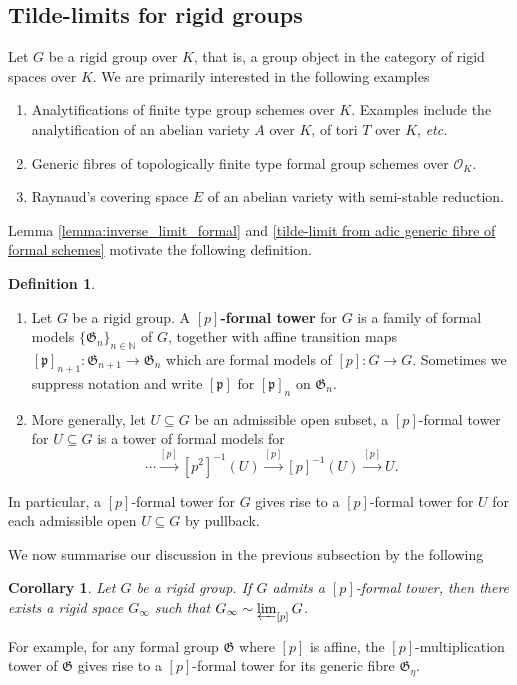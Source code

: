 \documentclass[10pt,oneside]{amsart}
\newtheorem{corollary}[theorem]{Corollary}
\theoremstyle{definition}
\newtheorem{definition}[theorem]{Definition}
\begin{document}
	
\subsection{Tilde-limits for rigid groups}

Let $G$ be a rigid group over $K$, that is, a group object in the category of rigid spaces over $K$.
	We are primarily interested in the following examples 
\begin{enumerate}	 
\item Analytifications of finite type group schemes over $K$. Examples include the analytification of an abelian variety $A$ over $K$, of tori $T$ over $K$, \textit{\small etc.}
\item Generic fibres of topologically finite type formal group schemes over $\mathcal O_K$. 
\item Raynaud's covering space $E$  of an abelian variety with semi-stable reduction.
\end{enumerate}

	Lemma \ref{lemma:inverse_limit_formal} and  \ref{tilde-limit from adic generic fibre of formal schemes} motivate the following definition. 
	\begin{definition}  \indent 
	
	\begin{enumerate}
	\item	Let $G$ be a rigid group. A \textbf{$[p]$-formal tower} for $G$ is  a family of formal models $\{\mathfrak G_n\}_{n\in \mathbb N}$ of $G$, together with affine transition maps $[\mathfrak p]_{n+1}:\mathfrak G_{n+1}\rightarrow \mathfrak G_{n}$ which are formal models of $[p]:G\rightarrow G$. Sometimes we suppress notation and write $[\mathfrak p]$ for $[\mathfrak p]_{n}$ on $\mathfrak G_n$. 
	\item	 More generally, let $U\subseteq G$ be an admissible open subset, a $[p]$-formal tower for $U \subseteq G$ is a tower of formal models for 
$$ \cdots \xrightarrow{[p]} [p^2]^{-1} (U)   \xrightarrow{[p]} [p]^{-1} (U)  \xrightarrow{[p]} U. $$  
	\end{enumerate}
	\end{definition}
	

In particular, a $[p]$-formal tower for $G$ gives rise to a $[p]$-formal tower for $U$ for each admissible open $U \subseteq G$ by pullback. 

 
	
	We now summarise our discussion in the previous subsection by the following
	\begin{corollary}
		Let $G$ be a rigid group. If $G$ admits a $[p]$-formal tower, then there exists a rigid space $G_\infty$ such that $G_\infty \sim \varprojlim_{[p]}G$.
	\end{corollary}
	For example, for any formal group $\mathfrak G$ where $[p]$ is affine, the $[p]$-multiplication tower of $\mathfrak G$ gives rise to a $[p]$-formal tower for its generic fibre $\mathfrak G_\eta$. 
	
\end{document}

